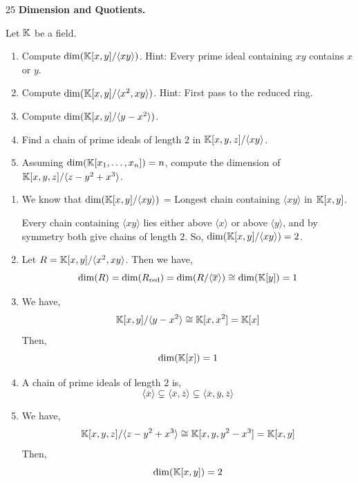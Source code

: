 \documentclass[Notebook.tex]{subfiles}
\begin{document}
\newpage 

\begin{problem}{25} \textbf{Dimension and Quotients.} 
    
    Let $\mathbb K$ be a field.
    \begin{enumerate}
        \item Compute $\dim(\mathbb K[x,y]/\langle xy\rangle)$. Hint: Every prime ideal containing $xy$ contains $x$ or $y$.
        \item Compute $\dim(\mathbb K[x,y]/\langle x^2,xy\rangle)$. Hint: First pass to the reduced ring.
        \item Compute $\dim(\mathbb K[x,y]/\langle y-x^2\rangle)$.
        \item Find a chain of prime ideals of length $2$ in $\mathbb K[x,y,z]/\langle xy\rangle$.
        \item Assuming $\dim(\mathbb K[x_1,\ldots,x_n])=n$, compute the dimension of $\mathbb K[x,y,z]/\langle z-y^2+x^3\rangle$.
    \end{enumerate}
\end{problem}

\begin{solution}
    \bbni
    \begin{enumerate}
        \item We know that $\dim(\mathbb K[x,y]/\langle xy \rangle)$ = Longest chain containing $\langle xy \rangle$ in $\mathbb K[x,y]$. 

        Every chain containing $\langle xy \rangle$ lies either above $\langle x\rangle$ or above $\langle y\rangle$, and by symmetry both give chains of length $2$. So, $\dim(\mathbb K[x,y]/\langle xy \rangle) = 2$. 

        \item Let $R = \mathbb K[x,y]/\langle x^2, xy \rangle$. Then we have, 
        \[\dim(R) = \dim(R_{\text{red}}) = \dim(R/\langle \overline{x} \rangle) \cong \dim(\mathbb K[y]) = 1\] 
        
        \item We have, 
        \[\mathbb K[x,y]/\langle y - x^2 \rangle \cong \mathbb K[x, x^2] = \mathbb K[x]\]
        Then, 
        \[\dim(\mathbb K[x]) = 1\]

        \item A chain of prime ideals of length $2$ is, 
        \[\langle \overline{x} \rangle \subsetneq \langle \overline{x}, \overline{z} \rangle \subsetneq \langle \overline{x}, \overline{y}, \overline{z} \rangle \]

        \item  We have, 
        \[\mathbb K[x,y,z]/\langle z - y^2 + x^3 \rangle \cong \mathbb K[x, y, y^2 - x^3] = \mathbb K[x,y]\]
        Then, 
        \[\dim(\mathbb K[x,y]) = 2\]
    \end{enumerate}
\end{solution}
\end{document}

